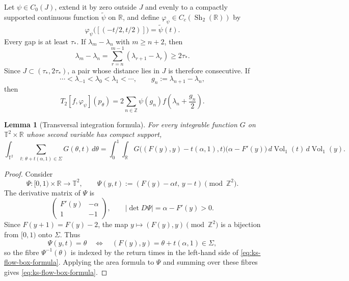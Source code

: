 \documentclass[11pt,reqno,a4paper]{amsart}
\numberwithin{equation}{section}
\theoremstyle{compact}
\newtheorem{lemma}[lemma]{Lemma}
\theoremstyle{definition}
\theoremstyle{definition}
\newcommand{\Vol}{\operatorname{Vol}}
\newcommand{\Sh}{\operatorname{Sh}}
\begin{document}
Let $\psi\in C_0(J)$, extend it by zero outside $J$ and evenly to a compactly
supported continuous function $\widetilde\psi$ on $\mathbb R$, and define
$\varphi_\psi\in C_c(\Sh_2(\mathbb R))$ by
\begin{equation}\label{eq:ks-pair-shape-test}
  \varphi_\psi\bigl([(-t/2,t/2)]\bigr)=\widetilde\psi(t).
\end{equation}
Every gap is at least $\tau_*$.  If $\lambda_m-\lambda_n$ with $m\geq n+2$,
then
\[
  \lambda_m-\lambda_n
  =\sum_{r=n}^{m-1}(\lambda_{r+1}-\lambda_r)
  \geq2\tau_*.
\]
Since $J\subset(\tau_*,2\tau_*)$, a pair whose distance lies in $J$ is
therefore consecutive.  If
\begin{equation}\label{eq:ks-ordered-points-gaps}
  \cdots<\lambda_{-1}<\lambda_0<\lambda_1<\cdots,
  \qquad
  g_n:=\lambda_{n+1}-\lambda_n,
\end{equation}
then
\begin{equation}\label{eq:ks-nearest-neighbour-pair-statistic}
  T_2[f,\varphi_\psi](p_\theta)
  =2\sum_{n\in\mathbb Z}
       \psi(g_n)f\!\left(\lambda_n+\frac{g_n}{2}\right).
\end{equation}

\begin{lemma}[Transversal integration formula]
\label{lem:ks-flow-box}
For every integrable function $G$ on $\mathbb T^2\times\mathbb R$ whose
second variable has compact support,
\begin{equation}\label{eq:ks-flow-box-formula}
  \int_{\mathbb T^2}
    \sum_{t:\,\theta+t(\alpha,1)\in\Sigma}
      G(\theta,t)\,d\theta
  =\int_0^1\int_{\mathbb R}
      G\bigl((F(y),y)-t(\alpha,1),t\bigr)
      \bigl(\alpha-F'(y)\bigr)
      \,d\Vol_1(t)\,d\Vol_1(y).
\end{equation}
\end{lemma}

\begin{proof}
Consider
\[
  \Psi:[0,1)\times\mathbb R\longrightarrow\mathbb T^2,
  \qquad
  \Psi(y,t):=(F(y)-\alpha t,\,y-t)\pmod{\mathbb Z^2}.
\]
The derivative matrix of $\Psi$ is
\[
  \begin{pmatrix}F'(y)&-\alpha\\1&-1\end{pmatrix},
  \qquad
  |\det D\Psi|=\alpha-F'(y)>0.
\]
Since $F(y+1)=F(y)-2$, the map
$y\mapsto(F(y),y)\pmod{\mathbb Z^2}$ is a bijection from $[0,1)$ onto
$\Sigma$.  Thus
\[
  \Psi(y,t)=\theta
  \quad\Longleftrightarrow\quad
  (F(y),y)=\theta+t(\alpha,1)\in\Sigma,
\]
so the fibre $\Psi^{-1}(\theta)$ is indexed by the return times in the
left-hand side of \eqref{eq:ks-flow-box-formula}.  Applying the area formula
to $\Psi$ and summing over these fibres gives
\eqref{eq:ks-flow-box-formula}.
\end{proof}
\end{document}
